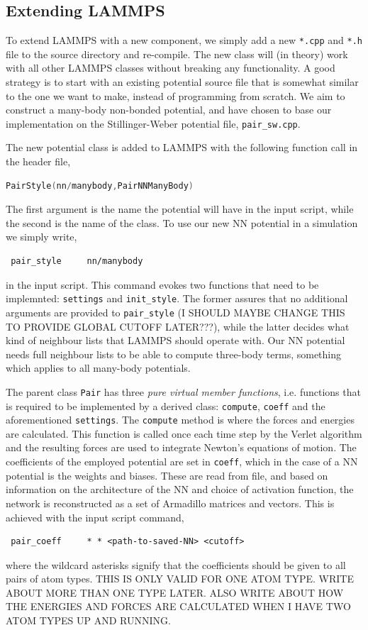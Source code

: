 \documentclass[twoside,english]{uiofysmaster}
\begin{document}
\subsection{Extending LAMMPS} \label{sec:extendingLammps}
To extend LAMMPS with a new component, we 
simply add a new \texttt{*.cpp} and \texttt{*.h} file to the 
source directory and re-compile. The new class
will (in theory) work with all other LAMMPS 
classes without breaking any functionality. 
A good strategy is to start with an existing potential
source file that is somewhat similar to the one 
we want to make, instead of programming from scratch.
We aim to construct a many-body non-bonded potential, and 
have chosen to base our implementation on the 
Stillinger-Weber potential file, \texttt{pair\_sw.cpp}.

The new potential class is added to LAMMPS with the following function call in the header file,
\begin{lstlisting}[language=c++]
 PairStyle(nn/manybody,PairNNManyBody)
\end{lstlisting}
The first argument is the name the potential will have in the input script, while 
the second is the name of the class. 
To use our new NN potential in a simulation we simply write,
\begin{lstlisting}
 pair_style 	nn/manybody
\end{lstlisting}
in the input script. This command evokes two functions that need to be implemnted: \texttt{settings}
and \texttt{init\_style}. The former assures that no additional arguments are provided to 
\texttt{pair\_style} (I SHOULD MAYBE CHANGE THIS TO PROVIDE GLOBAL CUTOFF LATER???), while the latter
decides what kind of neighbour lists that LAMMPS should operate with. Our NN potential needs 
full neighbour lists to be able to compute three-body terms, something which applies to all many-body potentials. 

The parent class \texttt{Pair} has three \textit{pure virtual member functions}, i.e. functions that is required
to be implemented by a derived class: \texttt{compute}, \texttt{coeff} and the aforementioned \texttt{settings}. 
The \texttt{compute} method is where the forces and energies are calculated. This function is called
once each time step by the Verlet algorithm and the resulting forces are used to integrate Newton's equations
of motion. The coefficients of the employed potential are set in \texttt{coeff}, which in the case of a NN potential
is the weights and biases. These are read from file, and based on information on the architecture of the NN and 
choice of activation function, the network is reconstructed as a set of Armadillo matrices and 
vectors. This is achieved with the input script command,
\begin{lstlisting}
 pair_coeff		* * <path-to-saved-NN> <cutoff> 
\end{lstlisting}
where the wildcard asterisks signify that the coefficients should be given to all pairs of atom types. 
THIS IS ONLY VALID FOR ONE ATOM TYPE. WRITE ABOUT MORE THAN ONE TYPE LATER. ALSO WRITE ABOUT
HOW THE ENERGIES AND FORCES ARE CALCULATED WHEN I HAVE TWO ATOM TYPES
UP AND RUNNING.
\end{document}
